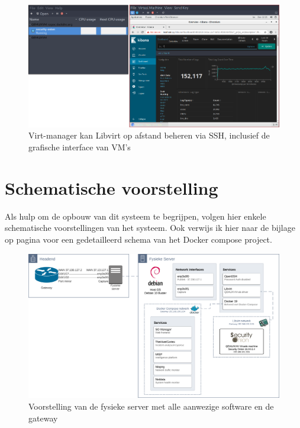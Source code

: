 \documentclass[a4paper,12pt]{report}
\begin{document}
\begin{figure}[H]
  \centering
  \includegraphics[width=\textwidth]{virt-manager}
  \caption{Virt-manager kan Libvirt op afstand beheren via SSH, inclusief de grafische interface van VM's}
  \label{fig:virt-manager}
\end{figure}

\section{Schematische voorstelling}
Als hulp om de opbouw van dit systeem te begrijpen, volgen hier enkele schematische voorstellingen van het systeem.
Ook verwijs ik hier naar de bijlage op pagina \pageref{bijlage:aangepast-systeem-schema-docker} voor een gedetailleerd schema van het Docker compose project.

\begin{figure}[H]
  \centering
  \includegraphics[width=\textwidth]{aangepast-systeem-schema-server}
  \caption{Voorstelling van de fysieke server met alle aanwezige software en de gateway}
  \label{fig:aangepast-systeem-schema-server}
\end{figure}
\end{document}
